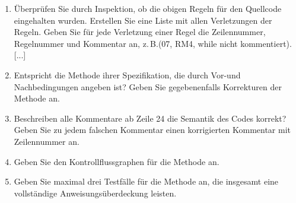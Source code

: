 \documentclass{lehramt-informatik-minimal}
\begin{document}
\begin{enumerate}

%

\item Überprüfen Sie durch Inspektion, ob die obigen Regeln für den
Quellcode eingehalten wurden. Erstellen Sie eine Liste mit allen
Verletzungen der Regeln. Geben Sie für jede Verletzung einer Regel die
Zeilennummer, Regelnummer und Kommentar an, z.\,B.(07, RM4, while nicht
kommentiert).[...]

%

\item Entspricht die Methode  ihrer Spezifikation,
die durch Vor-und Nachbedingungen angeben ist? Geben Sie gegebenenfalls
Korrekturen der Methode an.

%

\item Beschreiben alle Kommentare ab Zeile 24 die Semantik des Codes
korrekt? Geben Sie zu jedem falschen Kommentar einen korrigierten
Kommentar mit Zeilennummer an.

%

\item Geben Sie den Kontrollflussgraphen für
die Methode  an.

%

\item Geben Sie maximal drei Testfälle für die Methode
 an, die insgesamt eine vollständige
Anweisungsüberdeckung leisten.


\end{enumerate}
\end{document}

